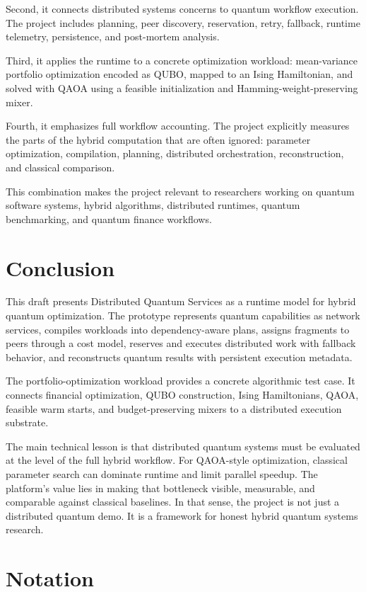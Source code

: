 \documentclass[11pt]{article}
\begin{document}
Second, it connects distributed systems concerns to quantum workflow execution. The project includes planning, peer discovery, reservation, retry, fallback, runtime telemetry, persistence, and post-mortem analysis.

Third, it applies the runtime to a concrete optimization workload: mean-variance portfolio optimization encoded as QUBO, mapped to an Ising Hamiltonian, and solved with QAOA using a feasible initialization and Hamming-weight-preserving mixer.

Fourth, it emphasizes full workflow accounting. The project explicitly measures the parts of the hybrid computation that are often ignored: parameter optimization, compilation, planning, distributed orchestration, reconstruction, and classical comparison.

This combination makes the project relevant to researchers working on quantum software systems, hybrid algorithms, distributed runtimes, quantum benchmarking, and quantum finance workflows.

\section{Conclusion}

This draft presents Distributed Quantum Services as a runtime model for hybrid quantum optimization. The prototype represents quantum capabilities as network services, compiles workloads into dependency-aware plans, assigns fragments to peers through a cost model, reserves and executes distributed work with fallback behavior, and reconstructs quantum results with persistent execution metadata.

The portfolio-optimization workload provides a concrete algorithmic test case. It connects financial optimization, QUBO construction, Ising Hamiltonians, QAOA, feasible warm starts, and budget-preserving mixers to a distributed execution substrate.

The main technical lesson is that distributed quantum systems must be evaluated at the level of the full hybrid workflow. For QAOA-style optimization, classical parameter search can dominate runtime and limit parallel speedup. The platform's value lies in making that bottleneck visible, measurable, and comparable against classical baselines. In that sense, the project is not just a distributed quantum demo. It is a framework for honest hybrid quantum systems research.

\appendix
\section{Notation}
\end{document}
